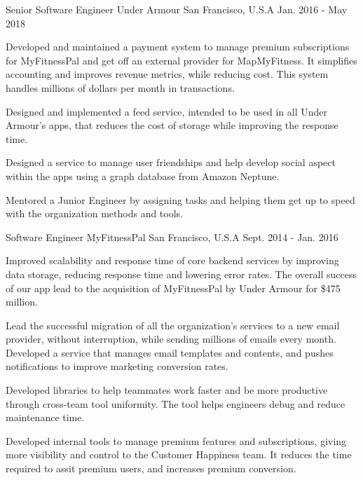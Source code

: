 \begin{cventries}
  \cventry
    {Senior Software Engineer}
    {Under Armour}
    {San Francisco, U.S.A}
    {Jan. 2016 - May 2018}
    {
      \begin{cvitems}
	\item{Developed and maintained a payment system to manage premium subscriptions for MyFitnessPal and get off an external provider for MapMyFitness. It simplifies accounting and improves revenue metrics, while reducing cost. This system handles millions of dollars per month in transactions. }
	\item {Designed and implemented a feed service, intended to be used in all Under Armour's apps, that reduces the cost of storage while improving the response time.}
        \item {Designed a service to manage user friendships and help develop social aspect within the apps using a graph database from Amazon Neptune. }	
	\item {Mentored a Junior Engineer by assigning tasks and helping them get up to speed with the organization methods and tools.}
      \end{cvitems}
    }
    
  \cventry
    {Software Engineer}
    {MyFitnessPal}
    {San Francisco, U.S.A}
    {Sept. 2014 - Jan. 2016}
    {
      \begin{cvitems}	
        \item{Improved scalability and response time of core backend services by improving data storage, reducing response time and lowering error rates. The overall success of our app lead to the acquisition of MyFitnessPal by Under Armour for \$475 million.}
        \item {Lead the successful migration of all the organization's services to a new email provider, without interruption, while sending millions of emails every month. Developed a service that manages email templates and contents, and pushes notifications to improve marketing conversion rates.}
        \item {Developed libraries to help teammates work faster and be more productive through cross-team tool uniformity. The tool helps engineers debug and reduce maintenance time.}
        \item{Developed internal tools to manage premium features and subscriptions, giving more visibility and control to the Customer Happiness team. It reduces the time required to assit premium users, and increases premium conversion.}
      \end{cvitems}
    }



\end{cventries}
